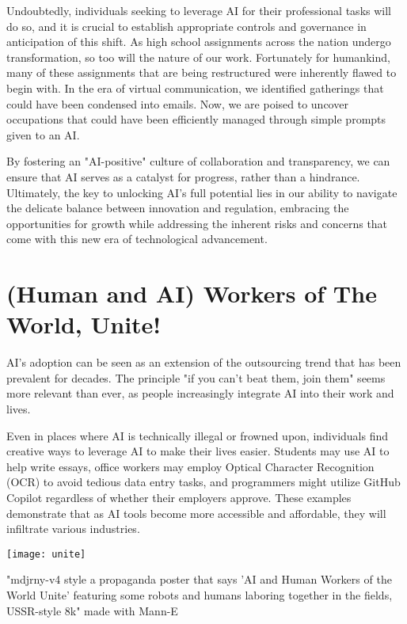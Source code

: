 Undoubtedly, individuals seeking to leverage AI for their professional tasks will do so, and it is crucial to establish appropriate controls and governance in anticipation of this shift. As high school assignments across the nation undergo transformation, so too will the nature of our work. Fortunately for humankind, many of these assignments that are being restructured were inherently flawed to begin with. In the era of virtual communication, we identified gatherings that could have been condensed into emails. Now, we are poised to uncover occupations that could have been efficiently managed through simple prompts given to an AI.

By fostering an "AI-positive" culture of collaboration and transparency, we can ensure that AI serves as a catalyst for progress, rather than a hindrance. Ultimately, the key to unlocking AI's full potential lies in our ability to navigate the delicate balance between innovation and regulation, embracing the opportunities for growth while addressing the inherent risks and concerns that come with this new era of technological advancement.

\section{(Human and AI) Workers of The World, Unite!}

AI's adoption can be seen as an extension of the outsourcing trend that has been prevalent for decades. The principle "if you can't beat them, join them" seems more relevant than ever, as people increasingly integrate AI into their work and lives.

Even in places where AI is technically illegal or frowned upon, individuals find creative ways to leverage AI to make their lives easier. Students may use AI to help write essays, office workers may employ Optical Character Recognition (OCR) to avoid tedious data entry tasks, and programmers might utilize GitHub Copilot regardless of whether their employers approve. These examples demonstrate that as AI tools become more accessible and affordable, they will infiltrate various industries.

\begin{marginfigure}[-5.5cm]
    \texttt{[image: unite]}
        \caption{"mdjrny-v4 style a propaganda poster that says 'AI and Human Workers of the World Unite' featuring some robots and humans laboring together in the fields, USSR-style 8k" made with Mann-E}
\end{marginfigure}

